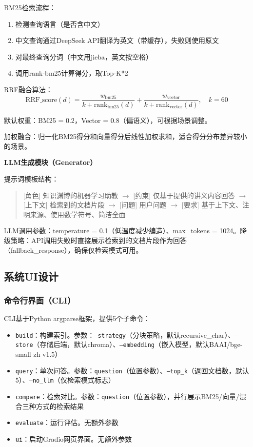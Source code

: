 \documentclass[10pt,a4paper]{article}
\begin{document}
BM25检索流程：
\begin{enumerate}[label=\alph*.]
\item 检测查询语言（是否含中文）
\item 中文查询通过DeepSeek API翻译为英文（带缓存），失败则使用原文
\item 对最终查询分词（中文用jieba，英文按空格）
\item 调用rank-bm25计算得分，取Top-K*2
\end{enumerate}

RRF融合算法：
\[
\text{RRF\_score}(d) = \frac{w_{\text{bm25}}}{k + \text{rank}_{\text{bm25}}(d)} + \frac{w_{\text{vector}}}{k + \text{rank}_{\text{vector}}(d)},\quad k = 60
\]

默认权重：BM25 = 0.2，Vector = 0.8（偏语义），可根据场景调整。

加权融合：归一化BM25得分和向量得分后线性加权求和，适合得分分布差异较小的场景。

\noindent\textbf{LLM生成模块（Generator）}

提示词模板结构：
\begin{quote}
[角色] 知识渊博的机器学习助教 $\to$ [约束] 仅基于提供的讲义内容回答 $\to$ [上下文] 检索到的文档片段 $\to$ [问题] 用户问题 $\to$ [要求] 基于上下文、注明来源、使用数学符号、简洁全面
\end{quote}

LLM调用参数：temperature = 0.1（低温度减少编造）、max\_tokens = 1024。降级策略：API调用失败时直接展示检索到的文档片段作为回答（fallback\_response），确保仅检索模式可用。

\subsection{系统UI设计}

\subsubsection{命令行界面（CLI）}

CLI基于Python argparse框架，提供5个子命令：
\begin{itemize}
\item \texttt{build}：构建索引。参数：\texttt{--strategy}（分块策略，默认recursive\_char）、\texttt{--store}（存储后端，默认chroma）、\texttt{--embedding}（嵌入模型，默认BAAI/bge-small-zh-v1.5）
\item \texttt{query}：单次问答。参数：\texttt{question}（位置参数）、\texttt{--top\_k}（返回文档数，默认5）、\texttt{--no\_llm}（仅检索模式标志）
\item \texttt{compare}：检索对比。参数：\texttt{question}（位置参数），并行展示BM25/向量/混合三种方式的检索结果
\item \texttt{evaluate}：运行评估。无额外参数
\item \texttt{ui}：启动Gradio网页界面。无额外参数
\end{itemize}
\end{document}
